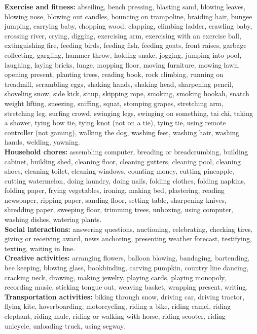 \documentclass{article} \usepackage{iclr2024_conference,times}
\begin{document}
\textbf{Exercise and fitness:} abseiling, bench pressing, blasting sand, blowing leaves, blowing nose, blowing out candles, bouncing on trampoline, braiding hair, bungee jumping, carrying baby, chopping wood, clapping, climbing ladder, crawling baby, crossing river, crying, digging, exercising arm, exercising with an exercise ball, extinguishing fire, feeding birds, feeding fish, feeding goats, front raises, garbage collecting, gargling, hammer throw, holding snake, jogging, jumping into pool, laughing, laying bricks, lunge, mopping floor, moving furniture, mowing lawn,  opening present, planting trees, reading book, rock climbing, running on treadmill, scrambling eggs, shaking hands, shaking head, sharpening pencil, shoveling snow, side kick, situp, skipping rope, smoking, smoking hookah, snatch weight lifting, sneezing, sniffing, squat, stomping grapes, stretching arm, stretching leg, surfing crowd, swinging legs, swinging on something, tai chi, taking a shower, tying bow tie, tying knot (not on a tie), tying tie, using remote controller (not gaming), walking the dog, washing feet, washing hair, washing hands, welding, yawning. \\
\textbf{Household chores:} assembling computer, breading or breadcrumbing, building cabinet, building shed, cleaning floor, cleaning gutters, cleaning pool, cleaning shoes, cleaning toilet, cleaning windows, counting money, cutting pineapple, cutting watermelon, doing laundry, doing nails, folding clothes, folding napkins, folding paper, frying vegetables, ironing, making bed, plastering, reading newspaper, ripping paper, sanding floor, setting table, sharpening knives, shredding paper, sweeping floor, trimming trees, unboxing, using computer, washing dishes, watering plants.\\
\textbf{Social interactions:} answering questions, auctioning, celebrating, checking tires, giving or receiving award, news anchoring, presenting weather forecast, testifying, texting, waiting in line.\\
\textbf{Creative activities:} arranging flowers, balloon blowing, bandaging, bartending, bee keeping, blowing glass, bookbinding, carving pumpkin, country line dancing, cracking neck, drawing, making jewelry, playing cards, playing monopoly, recording music, sticking tongue out, weaving basket, wrapping present, writing. \\
\textbf{Transportation activities:} biking through snow, driving car, driving tractor, flying kite, hoverboarding, motorcycling, riding a bike, riding camel, riding elephant, riding mule, riding or walking with horse, riding scooter, riding unicycle, unloading truck, using segway.\\
\end{document}
